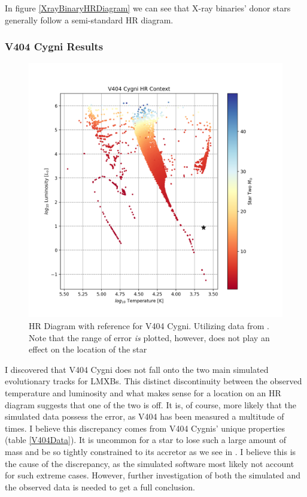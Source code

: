 \documentclass[12pt, a4paper]{article}
\begin{document}
        In figure \ref{XrayBinaryHRDiagram} we can see that X-ray binaries' donor stars generally follow a semi-standard HR diagram. 
        \subsubsection{V404 Cygni Results} \label{V404Results}
            \begin{figure}[H] 
                \centering
                \includegraphics[scale = .6]{figs/GeneratedFigs/V404_Cygni/V404XBsPopulationHRComp.png}
                \caption{HR Diagram with reference for V404 Cygni. Utilizing data from \parencite{Bartolomeo_2023}. Note that the range of error \textit{is} plotted, however, does not play an effect on the location of the star}
                \label{V404Context}
            \end{figure}

            I discovered that V404 Cygni does not fall onto the two main simulated evolutionary tracks for LMXBs. This distinct discontinuity between the observed temperature and luminosity and what makes sense for a location on an HR diagram suggests that one of the two is off. It is, of course, more likely that the simulated data possess the error, as V404 has been measured a multitude of times. I believe this discrepancy comes from V404 Cygnis' unique properties (table \ref{V404Data}). It is uncommon for a star to lose such a large amount of mass and be so tightly constrained to its accretor as we see in \cite{Bartolomeo_2023}. I believe this is the cause of the discrepancy, as the simulated software most likely not account for such extreme cases. However, further investigation of both the simulated and the observed data is needed to get a full conclusion. 
\end{document}
